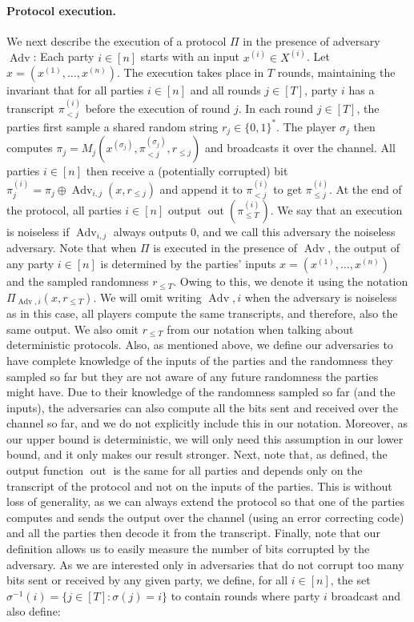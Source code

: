 \paragraph{Protocol execution.} We next describe the execution of a protocol $\Pi$ in the presence of adversary $\operatorname{Adv}$: Each party $i\in[n]$ starts with an input $x^{(i)}\in X^{(i)}$. Let $x=(x^{(1)},\ldots,x^{(n)})$. The execution takes place in $T$ rounds, maintaining the invariant that for all parties $i\in[n]$ and all rounds $j\in[T]$, party $i$ has a transcript $\pi_{<j}^{(i)}$ before the execution of round $j$. In each round $j\in[T]$, the parties first sample a shared random string $r_j\in\{0,1\}^*$. The player $\sigma_j$ then computes $\pi_j=M_j(x^{(\sigma_j)},\pi_{<j}^{(\sigma_j)},r_{\le j})$ and broadcasts it over the channel. All parties $i\in[n]$ then receive a (potentially corrupted) bit $\pi_j^{(i)}=\pi_j\oplus\operatorname{Adv}_{i,j}(x,r_{\le j})$ and append it to $\pi_{<j}^{(i)}$ to get $\pi_{\le j}^{(i)}$. At the end of the protocol, all parties $i\in[n]$ output $\operatorname{out}(\pi_{\le T}^{(i)})$. We say that an execution is noiseless if $\operatorname{Adv}_{i,j}$ always outputs 0, and we call this adversary the noiseless adversary.
Note that when $\Pi$ is executed in the presence of $\operatorname{Adv}$, the output of any party $i\in[n]$ is determined by the parties' inputs $x=(x^{(1)},\ldots,x^{(n)})$ and the sampled randomness $r_{\le T}$. Owing to this, we denote it using the notation $\Pi_{\operatorname{Adv},i}(x,r_{\le T})$. We will omit writing $\operatorname{Adv},i$ when the adversary is noiseless as in this case, all players compute the same transcripts, and therefore, also the same output. We also omit $r_{\le T}$ from our notation when talking about deterministic protocols. Also, as mentioned above, we define our adversaries to have complete knowledge of the inputs of the parties and the randomness they sampled so far but they are not aware of any future randomness the parties might have. Due to their knowledge of the randomness sampled so far (and the inputs), the adversaries can also compute all the bits sent and received over the channel so far, and we do not explicitly include this in our notation. Moreover, as our upper bound is deterministic, we will only need this assumption in our lower bound, and it only makes our result stronger.
Next, note that, as defined, the output function $\operatorname{out}$ is the same for all parties and depends only on the transcript of the protocol and not on the inputs of the parties. This is without loss of generality, as we can always extend the protocol so that one of the parties computes and sends the output over the channel (using an error correcting code) and all the parties then decode it from the transcript. Finally, note that our definition allows us to easily measure the number of bits corrupted by the adversary. As we are interested only in adversaries that do not corrupt too many bits sent or received by any given party, we define, for all $i\in[n]$, the set $\sigma^{-1}(i)=\{j\in[T]:\sigma(j)=i\}$ to contain rounds where party $i$ broadcast and also define:
